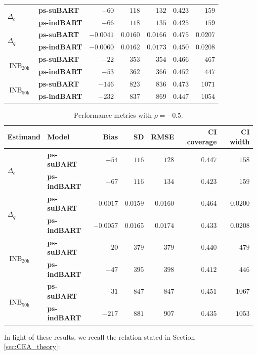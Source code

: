 \documentclass[aoas,preprint]{imsart}
\theoremstyle{plain}
\theoremstyle{definition}
\theoremstyle{remark}
\begin{document}
\begin{appendix}
\begin{table}[H]
\begin{tabular}{ll|rrrrr}
\hline
\multirow{2}{*}{$\Delta_c$} & \textbf{ps-suBART} & $-60$& $118$& $132$& $0.423$& $159$ \\
&\textbf{ps-indBART} & $-66$& $118$& $135$& $0.425$& $159$ \\
\multirow{2}{*}{$\Delta_q$} & \textbf{ps-suBART} & $-0.0041$& $0.0160$& $0.0166$& $0.475$& $0.0207$ \\
& \textbf{ps-indBART} &$-0.0060$& $0.0162$& $0.0173$& $0.450$& $0.0208$\\
\multirow{2}{*}{$\operatorname{INB}_{\mathrm{20k}}$} & \textbf{ps-suBART} &$-22$& $353$& $354$& $0.466$& $467$ \\
& \textbf{ps-indBART} & $-53$& $362$& $366$& $0.452$& $447$ \\
\multirow{2}{*}{$\operatorname{INB}_{\mathrm{50k}}$} & \textbf{ps-suBART} & $-146$ & $823$& $836$& $0.473$& $1071$ \\
& \textbf{ps-indBART} &$-232$& $837$& $869$& $0.447$& $1054$
\end{tabular}
\end{table}\vspace{-1em}%
\begin{table}[H]
\caption{Performance metrics with $\rho = -0.5$.\label{tab:indbart05}}
\setlength{\tabcolsep}{3.75pt}
\begin{tabular}{ll|rrrrr}
\textbf{Estimand} & \textbf{Model} & Bias & SD & RMSE & CI coverage & CI width \\
\hline
\multirow{2}{*}{$\Delta_c$} & \textbf{ps-suBART} & $-54$& $116$& $128$& $0.447$& $158$ \\
 & \textbf{ps-indBART} & $-67$& $116$& $134$& $0.423$& $159$ \\
\multirow{2}{*}{$\Delta_q$} & \textbf{ps-suBART} &$-0.0017$& $0.0159$& $0.0160$& $0.464$& $0.0200$ \\
 & \textbf{ps-indBART} & $-0.0057$& $0.0165$& $0.0174$& $0.433$& $0.0208$\\
\multirow{2}{*}{$\operatorname{INB}_{\mathrm{20k}}$} & \textbf{ps-suBART} & $20$& $379$& $379$& $0.440$& $479$ \\
& \textbf{ps-indBART} & $-47$& $395$& $398$& $0.412$& $446$ \\
\multirow{2}{*}{$\operatorname{INB}_{\mathrm{50k}}$} & \textbf{ps-suBART} & $-31$ & $847$& $847$& $0.451$& $1067$ \\
& \textbf{ps-indBART} & $-217$& $881$& $907$& $0.435$& $1053$
\end{tabular}
\end{table}%
In light of these results, we recall the relation stated in Section \ref{sec:CEA_theory}: 

\end{appendix}
\end{document}
